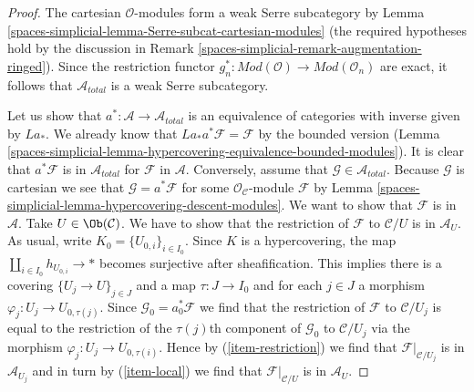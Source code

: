 \begin{proof}
The cartesian $\mathcal{O}$-modules form a weak Serre subcategory by
Lemma \ref{spaces-simplicial-lemma-Serre-subcat-cartesian-modules}
(the required hypotheses hold by the discussion in
Remark \ref{spaces-simplicial-remark-augmentation-ringed}).
Since the restriction functor
$g_n^* : \textit{Mod}(\mathcal{O}) \to \textit{Mod}(\mathcal{O}_n)$
are exact, it follows that $\mathcal{A}_{total}$ is a weak Serre
subcategory.

\medskip\noindent
Let us show that $a^* : \mathcal{A} \to \mathcal{A}_{total}$
is an equivalence of categories with inverse given by $La_*$.
We already know that $La_*a^*\mathcal{F} = \mathcal{F}$ by the
bounded version
(Lemma \ref{spaces-simplicial-lemma-hypercovering-equivalence-bounded-modules}).
It is clear that $a^*\mathcal{F}$ is in $\mathcal{A}_{total}$
for $\mathcal{F}$ in $\mathcal{A}$. Conversely, assume that
$\mathcal{G} \in \mathcal{A}_{total}$. Because $\mathcal{G}$
is cartesian we see that $\mathcal{G} = a^*\mathcal{F}$
for some $\mathcal{O}_\mathcal{C}$-module $\mathcal{F}$ by
Lemma \ref{spaces-simplicial-lemma-hypercovering-descent-modules}.
We want to show that $\mathcal{F}$ is in $\mathcal{A}$.
Take $U \in \Ob(\mathcal{C})$. We have to show that the
restriction of $\mathcal{F}$ to $\mathcal{C}/U$ is in $\mathcal{A}_U$.
As usual, write $K_0 = \{U_{0, i}\}_{i \in I_0}$.
Since $K$ is a hypercovering, the map $\coprod_{i \in I_0} h_{U_{0, i}} \to *$
becomes surjective after sheafification. This implies there is
a covering $\{U_j \to U\}_{j \in J}$ and a map $\tau : J \to I_0$
and for each $j \in J$ a morphism $\varphi_j : U_j \to U_{0, \tau(j)}$.
Since $\mathcal{G}_0 = a_0^*\mathcal{F}$ we find
that the restriction of $\mathcal{F}$ to $\mathcal{C}/U_j$
is equal to the restriction of the $\tau(j)$th component of
$\mathcal{G}_0$ to $\mathcal{C}/U_j$ via the morphism
$\varphi_j : U_j \to U_{0, \tau(i)}$. Hence by
(\ref{item-restriction}) we find that $\mathcal{F}|_{\mathcal{C}/U_j}$
is in $\mathcal{A}_{U_j}$ and in turn by
(\ref{item-local}) we find that $\mathcal{F}|_{\mathcal{C}/U}$
is in $\mathcal{A}_U$.


\end{proof}
